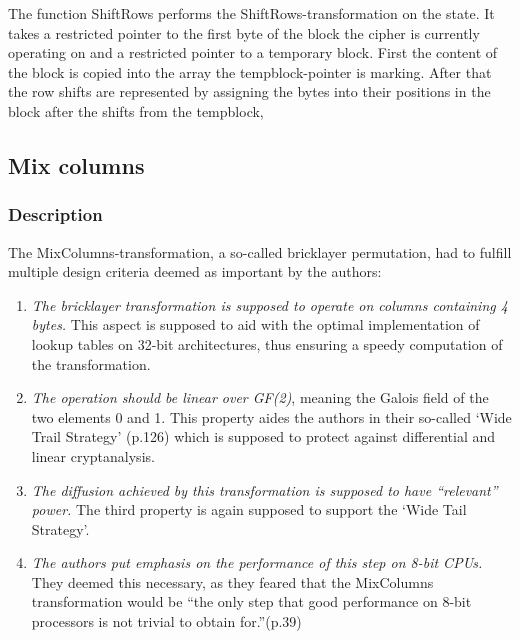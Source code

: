 The function ShiftRows performs the ShiftRows-transformation on the
state. It takes a restricted pointer to the first byte of the block the
cipher is currently operating on and a restricted pointer to a temporary
block. First the content of the block is copied into the array the
tempblock-pointer is marking. After that the row shifts are represented
by assigning the bytes into their positions in the block after the
shifts from the tempblock,

\hypertarget{mix-columns}{%
\subsection{Mix columns}\label{mix-columns}}

\hypertarget{description-4}{%
\subsubsection{Description}\label{description-4}}

The MixColumns-transformation, a so-called bricklayer permutation, had to fulfill
\cite[p.39]{rijndael} multiple design criteria deemed as important by the authors:

\begin{enumerate}
\def\labelenumi{\arabic{enumi}.}

\item
  \emph{The bricklayer transformation is supposed to operate on columns
  containing 4 bytes.} This aspect is supposed to aid with the optimal
  implementation of lookup tables on 32-bit architectures, thus
  ensuring a speedy computation of the transformation.
\item
  \emph{The operation should be linear over GF(2)}, meaning the Galois
  field of the two elements 0 and 1. This property aides the authors in
  their so-called `Wide Trail Strategy' (p.126) which is supposed to
  protect against differential and linear cryptanalysis.
\item
  \emph{The diffusion achieved by this transformation is supposed to
  have ``relevant'' power.} The third property is again supposed to
  support the `Wide Tail Strategy'.
\item
  \emph{The authors put emphasis on the performance of this step on 8-bit
  CPUs.} They deemed this necessary, as they feared that the MixColumns
  transformation would be ``the only step that good performance on 8-bit
  processors is not trivial to obtain for.''(p.39)
\end{enumerate}


